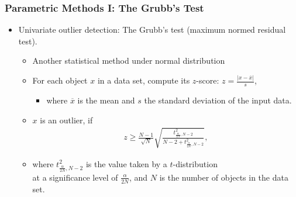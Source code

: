 \begin{frame}
  \frametitle{Parametric Methods I: The Grubb's Test}
  \begin{itemize}
  \item Univariate outlier detection: The Grubb's test (maximum normed residual test).
    \begin{itemize}
    \item Another statistical method under normal distribution
    \item For each object $x$ in a data set, compute its $z$-score:  $z = \frac{\vert x - \overline{x}\vert}{s}$,
      \begin{itemize}
      \item where $\overline{x}$ is the mean and $s$ the standard deviation of the input data.
      \end{itemize}
    \item $x$ is an outlier, if
      \begin{align}
        z \geq \frac{N-1}{\sqrt{N}} \sqrt{\frac{t^2_{\frac{\alpha}{2N},N-2}}{N-2 + t^2_{\frac{\alpha}{2N},N-2}}},
      \end{align}
    \end{itemize}
    \begin{itemize}
    \item where $t^2_{\frac{\alpha}{2N},N-2}$ is the value taken by a $t$-distribution \\
      at a significance level of $\frac{\alpha}{2N}$, and $N$ is the number of objects in the data set.
    \end{itemize}
  \end{itemize}
\end{frame}


